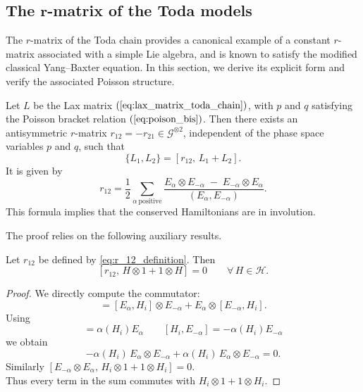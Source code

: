 \subsection[The \textit{r}-matrix of the Toda models]{The $\boldsymbol{r}$-matrix of the Toda models}\label{sec:toda_rmatrix}
The $r$-matrix of the Toda chain provides a canonical example of a constant $r$-matrix associated with a simple Lie algebra, and is known to satisfy the modified classical Yang–Baxter equation. In this section, we derive its explicit form and verify the associated Poisson structure.

\begin{theorem}
    Let $L$ be the Lax matrix $(\ref{eq:lax_matrix_toda_chain})$, with $p$ and $q$ satisfying the Poisson bracket relation $(\ref{eq:poison_bis})$.
    Then there exists an antisymmetric $r$-matrix 
    $r_{12} = - r_{21} \in \mathcal{G}^{\otimes 2}$,
    independent of the phase space variables $p$ and $q$, such that
    \begin{equation}
        \{ L_1 , L_2 \} = [ r_{12},\, L_1 + L_2 ].
    \end{equation}
    It is given by
    \begin{equation} \label{eq:r_12_definition}
        r_{12} = \frac12 \sum_{\alpha\ \text{positive}}
        \frac{E_{\alpha} \otimes E_{-\alpha} \;-\;
              E_{-\alpha} \otimes E_{\alpha}}
             {( E_{\alpha}, E_{-\alpha} )}.
    \end{equation}
    This formula implies that the conserved Hamiltonians are in involution.
\end{theorem}


The proof relies on the following auxiliary results.

\begin{lemma} \label{lemma:r_H}
    Let $r_{12}$ be defined by \eqref{eq:r_12_definition}.  
    Then
    \begin{equation}
        \left[r_{12},\,H\otimes1+1 \otimes H\right]=0
        \qquad \forall\, H \in \mathcal H.
    \end{equation}
\end{lemma}
\begin{proof}
    We directly compute the commutator:
    \begin{equation}
        [E_\alpha \otimes E_{-\alpha}, H_i \otimes 1 + 1 \otimes H_i] = [E_\alpha, H_i] \otimes E_{-\alpha} + E_{\alpha} \otimes [E_{-\alpha}, H_i].
    \end{equation}
    Using 
    \begin{equation}
        [H_i,E_\alpha] = \alpha(H_i) E_\alpha
        \qquad
        [H_i,E_{-\alpha}] = - \alpha(H_i) E_{-\alpha}
    \end{equation}
    we obtain
    \begin{equation}
        -\alpha(H_i) \, E_{\alpha} \otimes E_{-\alpha} + \alpha(H_i) \, E_{\alpha} \otimes E_{-\alpha} = 0.
    \end{equation}
    Similarly $ [E_{-\alpha}\otimes E_\alpha,\,H_i\otimes1+1 \otimes H_i] = 0 $. \\ 
    Thus every term in the sum commutes with $H_i\otimes1+1 \otimes H_i$.
\end{proof}

